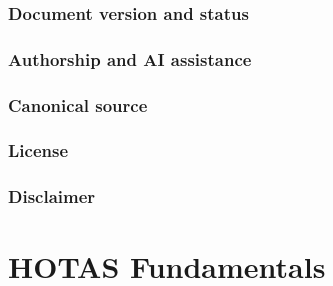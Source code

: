 \documentclass[11pt, a4paper, twoside]{report}
\begin{document}
\subsection{Document version and status}

\subsection{Authorship and AI assistance}

\subsection{Canonical source}

\subsection{License}

\subsection{Disclaimer}

\newpage
\chapter{HOTAS Fundamentals}

\end{document}
